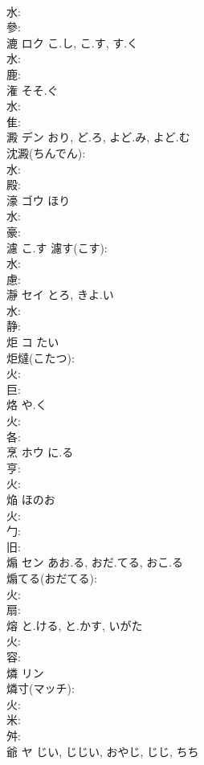 \documentclass[8pt]{extreport}
\begin{document}
\begin{CJK}{UTF8}{min}
\\	水: 
\\	參: 
\\	漉	ロク	こ.し, こ.す, す.く		
\\	水: 
\\	鹿: 
\\	潅		そそ.ぐ				
\\	水: 
\\	隹: 
\\	澱	デン	おり, ど.ろ, よど.み, よど.む		
\\	沈澱(ちんでん): 
\\	水: 
\\	殿: 
\\	濠	ゴウ	ほり		
\\	水: 
\\	豪: 
\\	濾		こ.す			濾す(こす): 
\\	水: 
\\	慮: 
\\	瀞	セイ	とろ, きよ.い		
\\	水: 
\\	静: 
\\	炬	コ		たい	
\\	炬燵(こたつ): 
\\	火: 
\\	巨: 
\\	烙		や.く				
\\	火: 
\\	各: 
\\	烹	ホウ	に.る		
\\	亨: 
\\	火: 
\\	焔		ほのお				
\\	火: 
\\	勹: 
\\	旧: 
\\	煽	セン	あお.る, おだ.てる, おこ.る		
\\	煽てる(おだてる): 
\\	火: 
\\	扇: 
\\	熔		と.ける, と.かす, いがた				
\\	火: 
\\	容: 
\\	燐	リン			
\\	燐寸(マッチ): 
\\	火: 
\\	米: 
\\	舛: 
\\	爺	ヤ	じい, じじい, おやじ, じじ, ちち		

\end{CJK}
\end{document}
